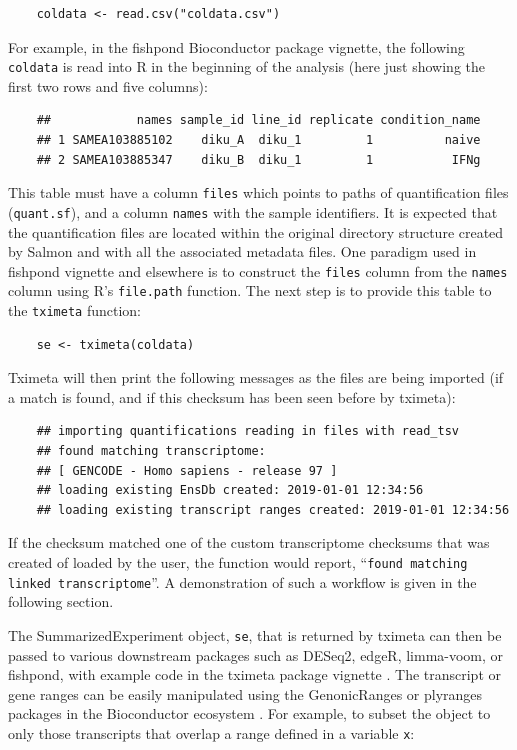 \documentclass[12pt]{article} \usepackage[utf8]{inputenc}
\begin{document}
\begin{verbatim}
    coldata <- read.csv("coldata.csv")
\end{verbatim}

For example, in the fishpond Bioconductor package vignette, the
following \texttt{coldata} is read into R in the beginning of the
analysis (here just showing the first two rows and five columns):

\begin{verbatim}
    ##            names sample_id line_id replicate condition_name
    ## 1 SAMEA103885102    diku_A  diku_1         1          naive
    ## 2 SAMEA103885347    diku_B  diku_1         1           IFNg
\end{verbatim}

This table must have a column \texttt{files} which points to paths of
quantification files (\texttt{quant.sf}), and a column \texttt{names} with the sample
identifiers. It is expected that the quantification files are located
within the original directory structure created by Salmon and with all
the associated metadata files. One paradigm used in fishpond vignette
and elsewhere is to construct the \texttt{files} column from the
\texttt{names} column using R's \texttt{file.path} function. The next
step is to provide this table to the \texttt{tximeta} function:

\begin{verbatim}
    se <- tximeta(coldata)
\end{verbatim}

Tximeta will then print the following messages as the files are being
imported (if a match is found, and if this checksum has been seen
before by tximeta):

\begin{verbatim}
    ## importing quantifications reading in files with read_tsv 
    ## found matching transcriptome: 
    ## [ GENCODE - Homo sapiens - release 97 ]
    ## loading existing EnsDb created: 2019-01-01 12:34:56 
    ## loading existing transcript ranges created: 2019-01-01 12:34:56
\end{verbatim}

If the checksum matched one of the custom transcriptome checksums that
was created of loaded by the user, the function would report,
``\texttt{found matching linked transcriptome}''. A demonstration of
such a workflow is given in the following section.

The SummarizedExperiment object, \texttt{se}, that is returned by
tximeta can then be passed to various downstream packages such as
DESeq2, edgeR, limma-voom, or fishpond, with example code in the
tximeta package vignette \citep{deseq2,edger,limma,voom,swish}. The
transcript or gene ranges can be easily manipulated using the
GenonicRanges or plyranges packages in the Bioconductor ecosystem
\citep{granges,Lee2019}. For example, to subset the object to only
those transcripts that overlap a range defined in a variable
\texttt{x}:
\end{document}
